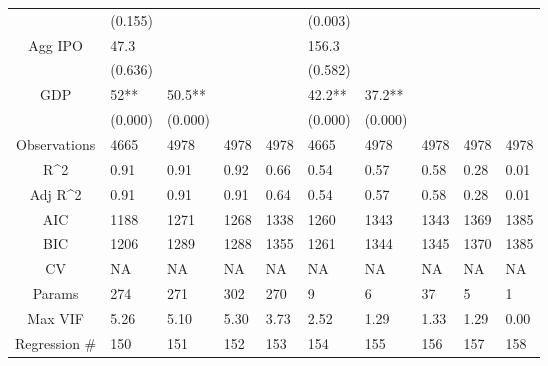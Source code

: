 \documentclass{article}
\begin{document}
\begin{table}[H]
\begin{tabular}{|clllllllll|}
   & (0.155) &  &  &  & (0.003) &  &  &  &  \\
  Agg IPO & 47.3 &  &  &  & 156.3 &  &  &  &  \\
   & (0.636) &  &  &  & (0.582) &  &  &  &  \\
  GDP & 52** & 50.5** &  &  & 42.2** & 37.2** &  &  &  \\
   & (0.000) & (0.000) &  &  & (0.000) & (0.000) &  &  &  \\
  \hline
 Observations & 4665 & 4978 & 4978 & 4978 & 4665 & 4978 & 4978 & 4978 & 4978 \\
  R^2 & 0.91 & 0.91 & 0.92 & 0.66 & 0.54 & 0.57 & 0.58 & 0.28 & 0.01 \\
  Adj R^2 & 0.91 & 0.91 & 0.91 & 0.64 & 0.54 & 0.57 & 0.58 & 0.28 & 0.01 \\
  AIC & 1188 & 1271 & 1268 & 1338 & 1260 & 1343 & 1343 & 1369 & 1385 \\
  BIC & 1206 & 1289 & 1288 & 1355 & 1261 & 1344 & 1345 & 1370 & 1385 \\
  CV & NA & NA & NA & NA & NA & NA & NA & NA & NA \\
  Params & 274 & 271 & 302 & 270 & 9 & 6 & 37 & 5 & 1 \\
  Max VIF & 5.26 & 5.10 & 5.30 & 3.73 & 2.52 & 1.29 & 1.33 & 1.29 & 0.00 \\
  Regression \# & 150 & 151 & 152 & 153 & 154 & 155 & 156 & 157 & 158 \\
   \hline
\end{tabular}

\end{table}
\end{document}
